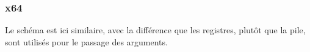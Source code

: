 \subsubsection{x64}

Le schéma est ici similaire, avec la différence que les registres, plutôt que la
pile, sont utilisés pour le passage des arguments.







